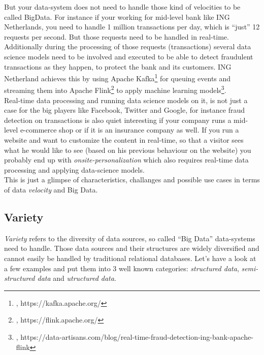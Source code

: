 But your data-system does not need to handle those kind of velocities to be called BigData. For instance if your working for mid-level bank like ING Netherlands, you need to handle 1 million transactions per day, which is ``just'' 12 requests per second. But those requests need to be handled in real-time. Additionally during the processing of those requests (transactions) several data science models need to be involved and executed to be able to detect fraudulent transactions as they happen, to protect the bank and its customers. ING Netherland achieves this by using Apache Kafka\footnote{\cite{KAFKAHP}, https://kafka.apache.org/} for queuing events and streaming them into Apache Flink\footnote{\cite{FLINKHP}, https://flink.apache.org/} to apply machine learning models\footnote{\cite{DAING}, https://data-artisans.com/blog/real-time-fraud-detection-ing-bank-apache-flink}. \\
Real-time data processing and running data science models on it, is not just a case for the big players like Facebook, Twitter and Google, for instance fraud detection on transactions is also quiet interesting if your company runs a mid-level e-commerce shop or if it is an insurance company as well. If you run a website and want to customize the content in real-time, so that a visitor sees what he would like to see (based on his previous behaviour on the website) you probably end up with \textit{onsite-personalization} which also requires real-time data processing and applying data-science models. \\
This is just a glimpse of characteristics, challanges and possible use cases in terms of data \textit{velocity} and Big Data.

\subsection{Variety}
\label{bd_vs_variety}
\textit{Variety} refers to the diversity of data sources, so called ``Big Data'' data-systems need to handle. Those data sources and their structures are widely diversified and cannot easily be handled by traditional relational databases. Let's have a look at a few examples and put them into 3 well known categories: \textit{structured data}, \textit{semi-structured data} and \textit{utructured data}.\\


